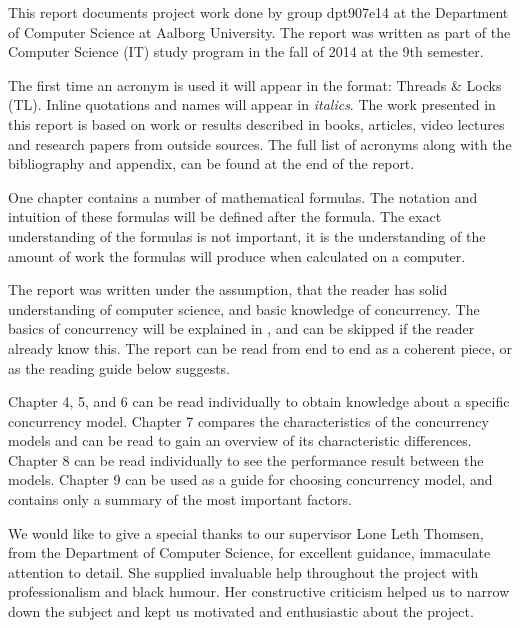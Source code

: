 \makeatletter {}\makeatother
{}
This report documents project work done by group dpt907e14 at the Department of Computer Science at Aalborg University. The report was written as part of the Computer Science (IT) study program in the fall of 2014 at the 9th semester.

The first time an acronym is used it will appear in the format: Threads \& Locks (TL). Inline quotations and names will appear in \textit{italics}. The work presented in this report is based on work or results described in books, articles, video lectures and research papers from outside sources. The full list of acronyms along with the bibliography and appendix, can be found at the end of the report.

One chapter contains a number of mathematical formulas. The notation and intuition of these formulas will be defined after the formula. The exact understanding of the formulas is not important, it is the understanding of the amount of work the formulas will produce when calculated on a computer.

The report was written under the assumption, that the reader has solid understanding of computer science, and basic knowledge of concurrency. The basics of concurrency will be explained in , and can be skipped if the reader already know this. The report can be read from end to end as a coherent piece, or as the reading guide below suggests.

Chapter 4, 5, and 6 can be read individually to obtain knowledge about a specific concurrency model. Chapter 7 compares the characteristics of the concurrency models and can be read to gain an overview of its characteristic differences. Chapter 8 can be read individually to see the performance result between the models. Chapter 9 can be used as a guide for choosing concurrency model, and contains only a summary of the most important factors.

We would like to give a special thanks to our supervisor Lone Leth Thomsen, from the Department of Computer Science, for excellent guidance, immaculate attention to detail. She supplied invaluable help throughout the project with professionalism and black humour. Her constructive criticism helped us to narrow down the subject and kept us motivated and enthusiastic about the project.


